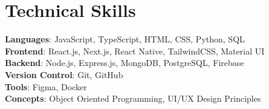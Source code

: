 \documentclass[letterpaper,11pt]{article}
\begin{document}
\section{Technical Skills}
 \begin{itemize}[leftmargin=0.15in, label={}]
    \small{\item{
     \textbf{Languages}{: JavaScript, TypeScript, HTML, CSS, Python, SQL} \\
     \textbf{Frontend}{: React.js, Next.js, React Native, TailwindCSS, Material UI } \\
     \textbf{Backend}{: Node.js, Express.js, MongoDB, PostgreSQL, Firebase} \\
     \textbf{Version Control}{: Git, GitHub} \\
     \textbf{Tools}{: Figma, Docker } \\
     \textbf{Concepts}{: Object Oriented Programming, UI/UX Design Principles } \\
    }}
 \end{itemize}

\end{document}
